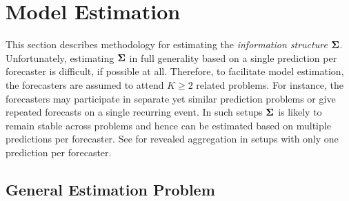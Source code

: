\documentclass[11pt]{article}
\theoremstyle{definition}
\theoremstyle{definition}
\def\bSigma{{\bf \Sigma}}
\begin{document}
\section{Model Estimation}
\label{estimator}
This section describes methodology for estimating the \textit{information structure} $\bSigma$.  
Unfortunately, estimating $\bSigma$ in full generality based on a single prediction per forecaster is difficult, if possible at all. Therefore, to facilitate model estimation, the forecasters are assumed to attend $K \geq 2$ related problems. For instance, the forecasters may participate in separate yet similar prediction problems or give repeated forecasts on a single recurring event. In such setups $\bSigma$ is likely to remain stable across problems and hence can be estimated based on multiple predictions per forecaster. See \cite{satopaamodeling} for revealed aggregation in setups with only one prediction per forecaster. 








\subsection{General Estimation Problem}
\label{generalEstimation}
\end{document}
